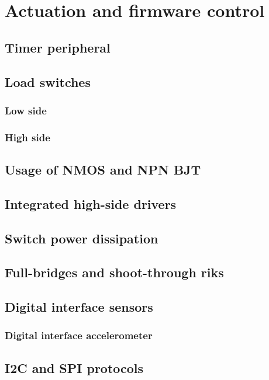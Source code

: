 \documentclass[../main.tex]{subfiles}
\begin{document}

\clearpage
\thispagestyle{empty}
\vspace*{7cm}
\section{Actuation and firmware control}
\vspace*{1.5cm}


\subsection{Timer peripheral}

\subsection{Load switches}
\subsubsection{Low side}
\subsubsection{High side}

\subsection{Usage of NMOS and NPN BJT}

\subsection{Integrated high-side drivers}

\subsection{Switch power dissipation}

\subsection{Full-bridges and shoot-through riks}


\subsection{Digital interface sensors} %
\subsubsection{Digital interface accelerometer}

\subsection{I2C and SPI protocols}
\end{document}
